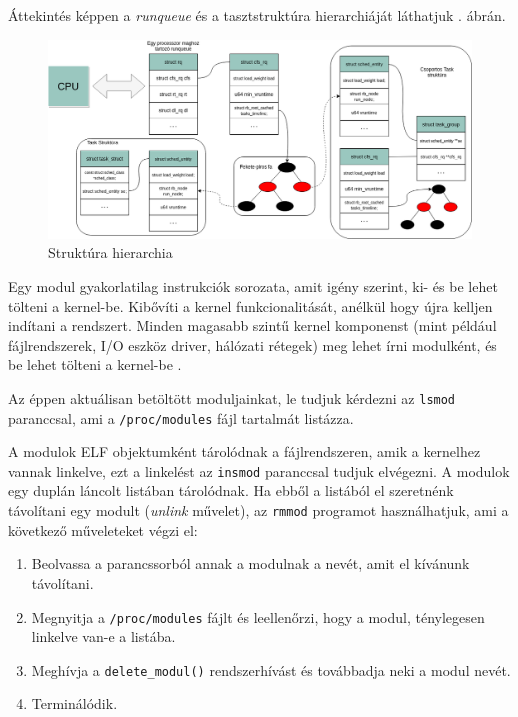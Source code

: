 Áttekintés képpen a \textit{runqueue} és a tasztstruktúra hierarchiáját láthatjuk . ábrán.

\begin{figure}[h!]
\centering
\includegraphics[width=\textwidth]{images/structureHierarchy.png}
\caption{Struktúra hierarchia}
\label{fig:structrb}
\end{figure}


Egy modul gyakorlatilag instrukciók sorozata, amit igény szerint, ki- és be lehet tölteni a kernel-be. Kibővíti a kernel funkcionalitását, anélkül hogy újra kelljen indítani a rendszert. Minden magasabb szintű kernel komponenst (mint például fájlrendszerek, I/O eszköz driver, hálózati rétegek) meg lehet írni modulként, és be lehet tölteni a kernel-be \cite{salzman2007linux, bovet2005understanding}.

Az éppen aktuálisan betöltött moduljainkat, le tudjuk kérdezni az \texttt{lsmod} paranccsal, ami a \texttt{/proc/modules} fájl tartalmát listázza.

A modulok ELF objektumként tárolódnak a fájlrendszeren, amik a kernelhez vannak linkelve, ezt a linkelést az \texttt{insmod} paranccsal tudjuk elvégezni.
A modulok egy duplán láncolt listában tárolódnak.
Ha ebből a listából el szeretnénk távolítani egy modult (\textit{unlink} művelet), az \texttt{rmmod} programot használhatjuk, ami a következő műveleteket végzi el:
\begin{enumerate}
	\item Beolvassa a parancssorból annak a modulnak a nevét, amit el kívánunk távolítani.
	\item Megnyitja a \texttt{/proc/modules} fájlt és leellenőrzi, hogy a modul, ténylegesen linkelve van-e a listába.
	\item Meghívja a \texttt{delete\_modul()} rendszerhívást és továbbadja neki a modul nevét.
	\item Terminálódik.
\end{enumerate} 

